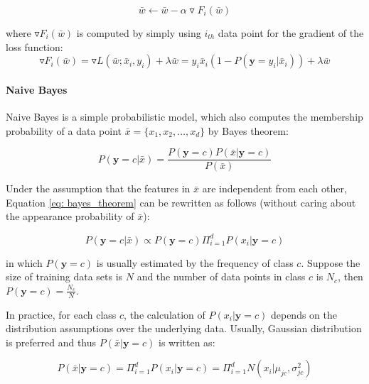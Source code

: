 \begin{equation}
    \bar{w} \leftarrow \bar{w} - \alpha \triangledown F_i(\bar{w})
\end{equation}

where $\triangledown F_i(\bar{w})$ is computed by simply using $i_{th}$ data point for the gradient of the loss function:
\begin{equation}
    \triangledown F_i(\bar{w}) = \triangledown L(\bar{w};\bar{x}_i,y_i) + \lambda \bar{w} = y_i\bar{x}_i(1-P(\textbf{y}=y_i|\bar{x}_i)) + \lambda \bar{w}
\end{equation}

\paragraph{Naive Bayes} Naive Bayes is a simple probabilistic model, which also computes the membership probability of a data point $\bar{x} = \{x_1, x_2, \dots, x_d\}$ by Bayes theorem:

\begin{equation}\label{eq: bayes_theorem}
P(\textbf{y}=c|\bar{x}) = \frac{P(\textbf{y}=c)P(\bar{x}|\textbf{y}=c)}{P(\bar{x})}    
\end{equation}

Under the assumption that the features in $\bar{x}$ are independent from each other, Equation \ref{eq: bayes_theorem} can be rewritten as follows (without caring about the appearance probability of $\bar{x}$):

\begin{equation}\label{eq: nb_exp}
    P(\textbf{y}=c|\bar{x}) \propto P(\textbf{y}=c)\Pi_{i=1}^dP(x_i|\textbf{y}=c)
\end{equation}

in which $P(\textbf{y}=c)$ is usually estimated by the frequency of class $c$. Suppose the size of training data sets is $N$ and the number of data points in class $c$ is $N_c$, then $P(\textbf{y}=c) = \frac{N_c}{N}$.

In practice, for each class $c$, the calculation of $P(x_i|\textbf{y}=c)$ depends on the distribution assumptions over the underlying data. Usually, Gaussian distribution is preferred and thus $P(\bar{x}|\textbf{y}=c)$ is written as:

\begin{equation}\label{eq: nb_guassian}
    P(\bar{x}|\textbf{y}=c) = \Pi_{i=1}^dP(x_i|\textbf{y}=c) = \Pi_{i=1}^dN(x_i|\mu_{jc}, \sigma_{jc}^2)
\end{equation}

